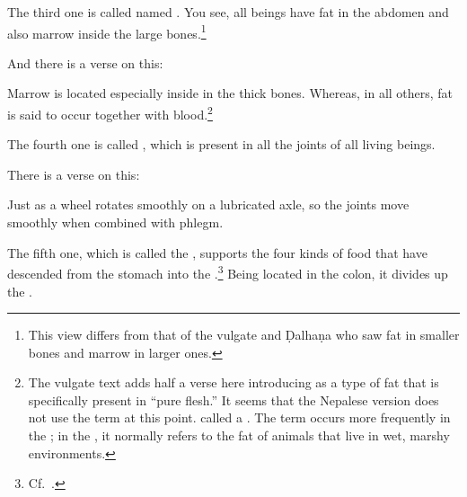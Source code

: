 \begin{translation}
 
 
 \item[12]
 
The third one is called named  .  You
see, all beings have fat in the abdomen and also marrow inside the large 
bones.\footnote{This view differs from that of the vulgate and Ḍalhaṇa who 
saw fat in smaller bones and marrow in larger ones.}
 
 \item[13]
 
 And there is a verse on this:
 
\begin{sloka}
Marrow is located especially inside in the thick bones.  Whereas, in
all others, fat is said to occur together with blood.\footnote{The
    vulgate text adds half a verse here introducing  as a type
    of fat that is specifically present in “pure flesh.”  It seems that
    the Nepalese version does not use the term  at this 
    point.
     called  a 
    .   The term occurs more frequently in the \CS; in the \SS, it normally 
    refers to the fat of animals that live in wet, marshy environments.}
\end{sloka} 


\item[14]

The fourth one is called  , which is present 
in all the joints of all living beings.

 

\item[15]

There is a verse on this:

\begin{sloka}
Just as a wheel rotates smoothly on a lubricated axle, so the joints
move smoothly when combined with phlegm. 
\end{sloka} 
 
 
\item[16]

The fifth one, which is called the ,
supports the four kinds  of food that have descended from the stomach
into the .\footnote{Cf.\ \cite[177]{das-2003}.}
    Being located in the colon, it divides up the .
 
 
 
 \item[17]
 

\end{translation}
